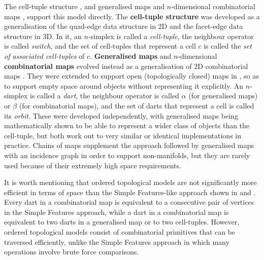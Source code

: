 The cell-tuple structure \citep{Brisson89}, and generalised maps and $n$-dimensional combinatorial maps \citep{Lienhardt94}, support this model directly.
The \textbf{cell-tuple structure} was developed as a generalisation of the quad-edge \citep{Guibas85} data structure in 2D and the facet-edge data structure \citep{Dobkin87} in 3D.
In it, an $n$-simplex is called a \emph{cell-tuple}, the neighbour operator is called \emph{switch}, and the set of cell-tuples that represent a cell $c$ is called the \emph{set of associated cell-tuples} of $c$.
\textbf{Generalised maps} and $n$-dimensional \textbf{combinatorial maps} \citep{Lienhardt94} evolved instead as a generalisation of 2D combinatorial maps \citep{Edmonds60}.
They were extended to support open (topologically closed) maps in \citet{Poudret07}, so as to support empty space around objects without representing it explicitly.
An $n$-simplex is called a \emph{dart}, the neighbour operator is called $\alpha$ (for generalised maps) or $\beta$ (for combinatorial maps), and the set of darts that represent a cell is called its \emph{orbit}.
These were developed independently, with generalised maps being mathematically shown to be able to represent a wider class of objects than the cell-tuple, but both work out to very similar or identical implementations in practice.
Chains of maps \citep{Elter94} supplement the approach followed by generalised maps with an incidence graph in order to support non-manifolds, but they are rarely used because of their extremely high space requirements.

It is worth mentioning that ordered topological models are not significantly more efficient in terms of space than the Simple Features-like \citep{SimpleFeatures1} approach shown in  and .
Every dart in a combinatorial map is equivalent to a consecutive pair of vertices in the Simple Features approach, while a dart in a combinatorial map is equivalent to two darts in a generalised map or to two cell-tuples.
However, ordered topological models consist of combinatorial primitives that can be traversed efficiently, unlike the Simple Features approach in which many operations involve brute force comparisons.


